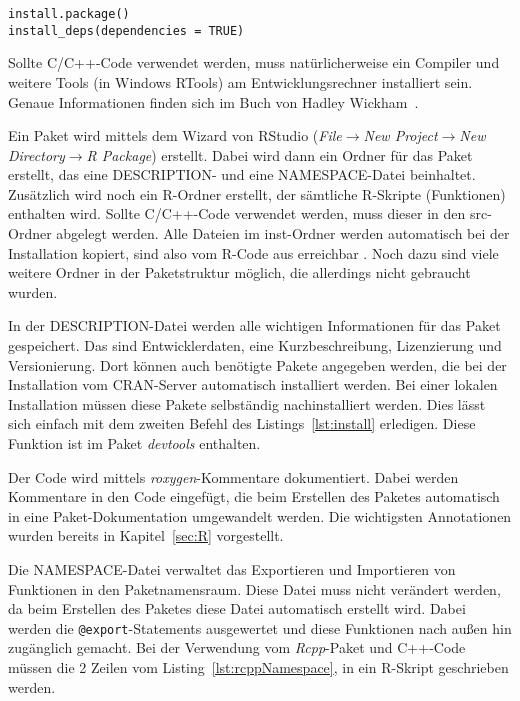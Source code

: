\begin{lstlisting}[caption=Installation eines Paketes und dessen Abhängigkeiten, label={lst:install}, float=!th]
install.package()
install_deps(dependencies = TRUE)
\end{lstlisting}

Sollte C/C++-Code verwendet werden, muss natürlicherweise ein Compiler und weitere Tools (in Windows RTools) am Entwicklungsrechner installiert sein. Genaue Informationen finden sich im Buch von Hadley Wickham~\cite[S.~18~ff.]{wickham2015r}.

Ein Paket wird mittels dem Wizard von RStudio (\emph{File$\rightarrow$New Project$\rightarrow$New Directory$\rightarrow$R Package}) erstellt. Dabei wird dann ein Ordner für das Paket erstellt, das eine DESCRIPTION- und eine NAMESPACE-Datei beinhaltet. Zusätzlich wird noch ein R-Ordner erstellt, der sämtliche R-Skripte (Funktionen) enthalten wird. Sollte C/C++-Code verwendet werden, muss dieser in den src-Ordner abgelegt werden. Alle Dateien im inst-Ordner werden automatisch bei der Installation kopiert, sind also vom R-Code aus erreichbar \cite[S.~196~ff.]{wickham2015r}. Noch dazu sind viele weitere Ordner in der Paketstruktur möglich, die allerdings nicht gebraucht wurden.~\cite[S.~28~ff.]{wickham2015r}

In der DESCRIPTION-Datei werden alle wichtigen Informationen für das Paket gespeichert. Das sind Entwicklerdaten, eine Kurzbeschreibung, Lizenzierung und Versionierung. Dort können auch benötigte Pakete angegeben werden, die bei der Installation vom CRAN-Server automatisch installiert werden. Bei einer lokalen Installation müssen diese Pakete selbständig nachinstalliert werden. Dies lässt sich einfach mit dem zweiten Befehl des Listings~\ref{lst:install} erledigen. Diese Funktion ist im Paket \emph{devtools} enthalten.~\cite[67-82]{wickham2015r}

Der Code wird mittels \emph{roxygen}-Kommentare dokumentiert. Dabei werden Kommentare in den Code eingefügt, die beim Erstellen des Paketes automatisch in eine Paket-Dokumentation umgewandelt werden. Die wichtigsten Annotationen wurden bereits in Kapitel~\ref{sec:R} vorgestellt.~\cite[83-110]{wickham2015r}

Die NAMESPACE-Datei verwaltet das Exportieren und Importieren von Funktionen in den Paketnamensraum. Diese Datei muss nicht verändert werden, da beim Erstellen des Paketes diese Datei automatisch erstellt wird. Dabei werden die \texttt{@export}-Statements ausgewertet und diese Funktionen nach außen hin zugänglich gemacht. Bei der Verwendung vom \emph{Rcpp}-Paket und C++-Code müssen die 2 Zeilen vom Listing~\ref{lst:rcppNamespace}, in ein R-Skript geschrieben werden.~\cite[144-160]{wickham2015r}

